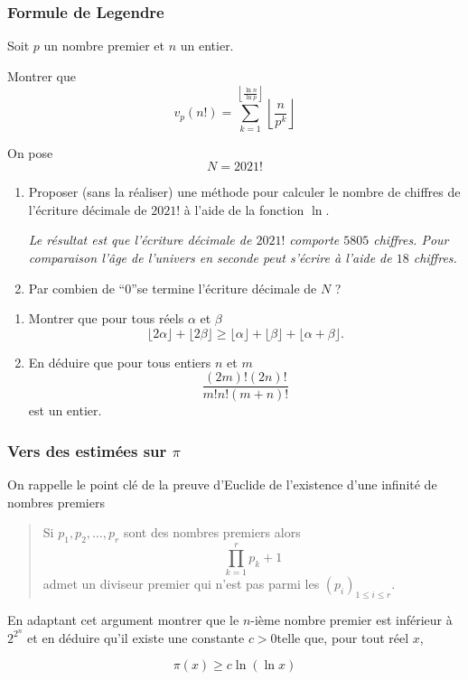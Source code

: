 \subsubsection{Formule de Legendre}

\begin{exo}
Soit $p$ un nombre premier et $n$ un entier.

Montrer que
$$v_p(n!) = \sum_{k = 1}^{\left\lfloor \frac{\ln n}{\ln p} \right\rfloor} \left\lfloor \frac n{p^k} \right\rfloor$$
\end{exo}


\begin{exo}
 On pose
$$N = 2021!$$
\begin{enumerate}
\item Proposer (sans la réaliser) une méthode pour calculer le nombre de chiffres de l'écriture décimale de $2021!$ à l'aide de la fonction $\ln$.

\textit{\small Le résultat est que l'écriture décimale de $2021!$ comporte $5805$ chiffres. Pour comparaison l'âge de l'univers en seconde peut s'écrire à l'aide de $18$ chiffres.}
\item Par combien de ``$0$''se termine l'écriture décimale de $N$ ?
\end{enumerate}
\end{exo}


\begin{exo}
\begin{enumerate}
\item Montrer que pour tous réels $\alpha$ et $\beta$
$$\lfloor 2 \alpha \rfloor  + \lfloor  2\beta\rfloor \ge \lfloor \alpha \rfloor + \lfloor \beta \rfloor + \lfloor \alpha + \beta \rfloor. $$
\item En déduire que pour tous entiers $n$ et $m$
$$ \frac{(2m)! (2n)!}{m! n! (m + n)!}$$
est un entier.
\end{enumerate}
\end{exo}

\subsubsection{Vers des estimées sur $\pi$}

\begin{exo}
On rappelle le point clé de la preuve d'Euclide de l'existence d'une infinité de nombres premiers
\begin{quote}
Si $p_1, p_2, \ldots, p_r$ sont des nombres premiers alors
$$\prod_{k = 1}^r p_k + 1$$
admet un diviseur premier qui n'est pas parmi les $(p_i)_{1 \le i \le r}$.


\end{quote}
En adaptant cet argument montrer que le $n$-ième nombre premier est inférieur à $2^{2^n}$ et en déduire qu'il existe une constante $c>0$telle que, pour tout réel $x$,

$$\pi(x) \ge c \ln(\ln x)$$
\end{exo}


